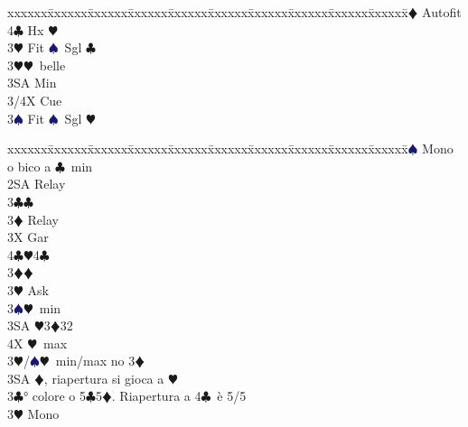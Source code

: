 \documentclass[a4paper,italian]{article}
\newcommand{\BC}{\textcolor{OliveGreen}{$\clubsuit$}}
\newcommand{\BD}{\textcolor{RedOrange}{$\vardiamondsuit$}}
\newcommand{\BH}{\textcolor{Red2}{$\varheartsuit${}}}
\newcommand{\BS}{\textcolor{MidnightBlue}{$\spadesuit${}}}
\newenvironment{bidtable}
{\begin{tabbing}

    xxxxxx\=xxxxxx\=xxxxxx\=xxxxxx\=xxxxxx\=xxxxxx\=xxxxxx\=xxxxxx\=xxxxxx\=xxxxxx\=\kill}
{\end{tabbing} }%
\begin{document}
\begin{multicols}{2}
\begin{bidtable}
                                            4\BD \> Autofit\\
                                            4\BC \> Hx \BH \-\-\\
                                            3\BH \> Fit \BS\ Sgl \BC \+\\
                                            3\BH {}\BH\ belle\\
                                            3SA \> Min\\
                                            3/4X \> Cue\-\\
                                            3\BS \> Fit \BS\ Sgl \BH \-\\
                                        \end{bidtable}
                                        \columnbreak
                                        \begin{bidtable}
                                            2\BS \> Mono o bico a \BC\ min\+\\
                                            2SA \> Relay\+\\
                                            3\BC {}\BC \+\\
                                            3\BD \> Relay\+\\
                                            3X \> Gar\\
                                            4\BC {}\BH 4\BC \-\-\\
                                            3\BD {}\BD \+\\
                                            3\BH \> Ask\+\\
                                            3\BS {}\BH\ min\\
                                            3SA \BH 3\BD 32\\
                                            4X \BH\ max\-\-\\
                                            3\BH/\BS {}\BH\ min/max no 3\BD \\
                                            3SA \BD , riapertura si gioca a \BH \-\\
                                            3\BC {}° colore o 5\BC 5\BD . Riapertura a 4\BC\ è 5/5\+\\
                                            3\BH \> Mono\+\\

\end{bidtable}
\end{multicols}
\end{document}
